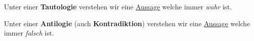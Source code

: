 \documentclass[../../main.tex]{subfiles}
\begin{document}
	\begin{definition}[Tautologie]
		Unter einer \textbf{Tautologie} verstehen wir eine \hyperref[def:Aussage]{Aussage} welche immer \textit{wahr} ist.
	\end{definition}

	\begin{definition}
		Unter einer \textbf{Antilogie} (auch \textbf{Kontradiktion}) verstehen wir eine \hyperref[def:Aussage]{Aussage} welche immer \textit{falsch} ist.
	\end{definition}
	
\end{document}
